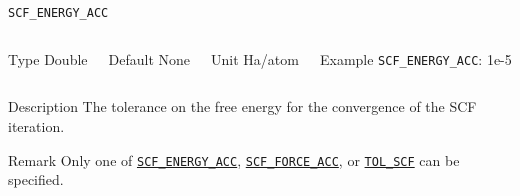 \documentclass[xcolor=dvipsnames,t]{beamer}
\begin{document}
\begin{frame}[allowframebreaks]{\texttt{SCF\_ENERGY\_ACC}} \label{SCF_ENERGY_ACC}
\vspace*{-12pt}
\begin{columns}
\begin{block}{Type}
Double
\end{block}

\begin{block}{Default}
None
\end{block}

\begin{block}{Unit}
Ha/atom
\end{block}

\begin{block}{Example}
\texttt{SCF\_ENERGY\_ACC}: 1e-5
\end{block}
\end{columns}

\begin{block}{Description}
The tolerance on the free energy for the convergence of the SCF iteration. 
\end{block}

\begin{block}{Remark}
Only one of \hyperlink{SCF_ENERGY_ACC}{\texttt{SCF\_ENERGY\_ACC}}, \hyperlink{SCF_FORCE_ACC}{\texttt{SCF\_FORCE\_ACC}}, or \hyperlink{TOL_SCF}{\texttt{TOL\_SCF}} can be specified.
\end{block}

\end{frame}
\end{document}

